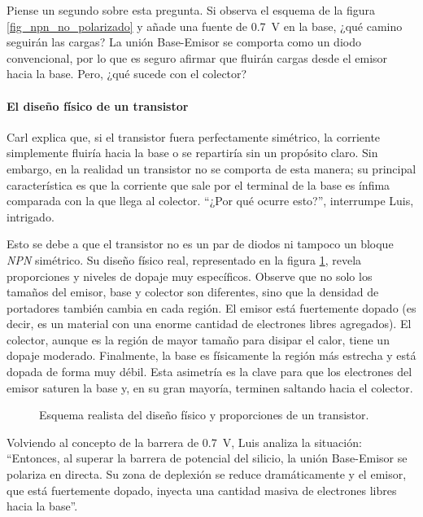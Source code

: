 Piense un segundo sobre esta pregunta. Si observa el esquema de la figura \ref{fig_npn_no_polarizado} y añade una fuente de \qty{0.7}{\volt} en la base, ¿qué camino seguirán las cargas? La unión Base-Emisor se comporta como un diodo convencional, por lo que es seguro afirmar que fluirán cargas desde el emisor hacia la base. Pero, ¿qué sucede con el colector?

\paragraph{El diseño físico de un transistor} Carl explica que, si el transistor fuera perfectamente simétrico, la corriente simplemente fluiría hacia la base o se repartiría sin un propósito claro. Sin embargo, en la realidad un transistor no se comporta de esta manera; su principal característica es que la corriente que sale por el terminal de la base es ínfima comparada con la que llega al colector. ``¿Por qué ocurre esto?'', interrumpe Luis, intrigado.

Esto se debe a que el transistor no es un par de diodos ni tampoco un bloque \emph{NPN} simétrico. Su diseño físico real, representado en la figura \ref{fig_npn_representacion_real}, revela proporciones y niveles de dopaje muy específicos. Observe que no solo los tamaños del emisor, base y colector son diferentes, sino que la densidad de portadores también cambia en cada región. El emisor está fuertemente dopado (es decir, es un material con una enorme cantidad de electrones libres agregados). El colector, aunque es la región de mayor tamaño para disipar el calor, tiene un dopaje moderado. Finalmente, la base es físicamente la región más estrecha y está dopada de forma muy débil. Esta asimetría es la clave para que los electrones del emisor saturen la base y, en su gran mayoría, terminen saltando hacia el colector.

\begin{figure}[!ht]
  \centering
  
  \caption{Esquema realista del diseño físico y proporciones de un transistor.}
  \label{fig_npn_representacion_real}
\end{figure}

Volviendo al concepto de la barrera de \qty{0.7}{\volt}, Luis analiza la situación: ``Entonces, al superar la barrera de potencial del silicio, la unión Base-Emisor se polariza en directa. Su zona de deplexión se reduce dramáticamente y el emisor, que está fuertemente dopado, inyecta una cantidad masiva de electrones libres hacia la base''.

